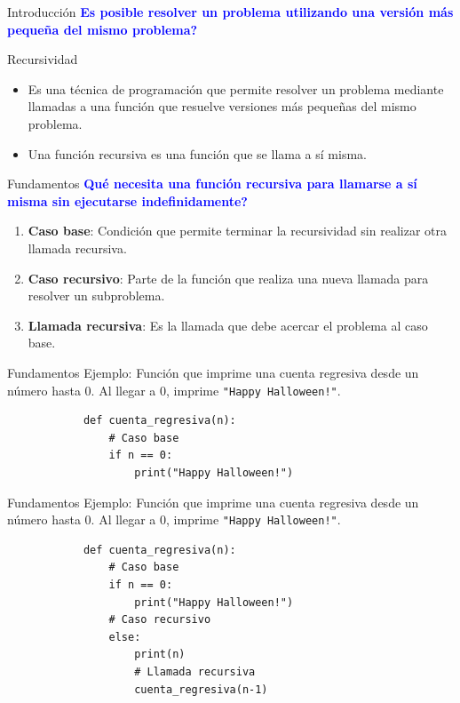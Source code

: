 \documentclass{beamer}
\begin{document}
    \begin{frame}{Introducción}
        \textcolor{blue}{\textbf{Es posible resolver un problema utilizando una versión más pequeña del mismo problema?}}    
    \end{frame}

    \begin{frame}{Recursividad}
        \begin{itemize}
            \item Es una técnica de programación que permite resolver un problema mediante 
            llamadas a una función que resuelve versiones más pequeñas del mismo problema.
            \item Una función recursiva es una función que se llama a sí misma.
        \end{itemize}
    \end{frame}

    \begin{frame}{Fundamentos}
        \textcolor{blue}{\textbf{Qué necesita una función recursiva para llamarse a sí misma sin ejecutarse indefinidamente?}}
        \begin{enumerate}
            \item \textbf{Caso base}: Condición que permite terminar la recursividad sin realizar otra llamada recursiva.
            \item \textbf{Caso recursivo}: Parte de la función que realiza una nueva llamada para resolver un subproblema.
            \item \textbf{Llamada recursiva}: Es la llamada que debe acercar el problema al caso base.
        \end{enumerate}
    \end{frame}

    \begin{frame}[fragile, t]{Fundamentos}
        Ejemplo: Función que imprime una cuenta regresiva desde un número hasta 0. Al llegar a 0, imprime \texttt{"Happy Halloween!"}.
        \begin{verbatim}
            def cuenta_regresiva(n):
                # Caso base
                if n == 0:
                    print("Happy Halloween!")
        \end{verbatim}
    \end{frame}

    \begin{frame}[fragile, t]{Fundamentos}
        Ejemplo: Función que imprime una cuenta regresiva desde un número hasta 0. Al llegar a 0, imprime \texttt{"Happy Halloween!"}.
        \begin{verbatim}
            def cuenta_regresiva(n):
                # Caso base
                if n == 0:
                    print("Happy Halloween!")
                # Caso recursivo
                else:
                    print(n) 
                    # Llamada recursiva
                    cuenta_regresiva(n-1) 
        \end{verbatim}
    \end{frame}
\end{document}
